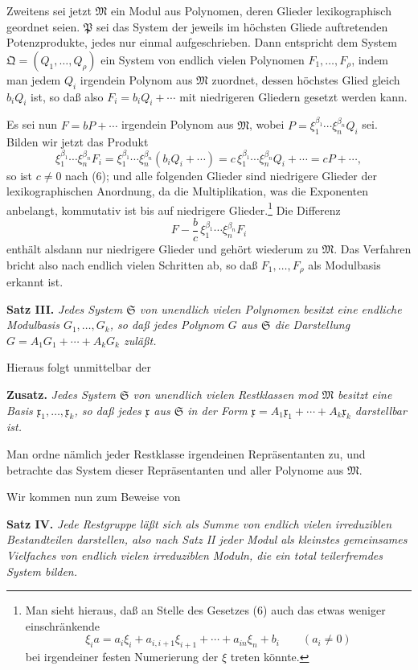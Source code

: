 \documentclass[11pt]{article}
\newcommand{\mM}{\mathfrak{M}}
\newcommand{\mx}{\mathfrak{x}}
\newcommand{\mP}{\mathfrak{P}}
\newcommand{\mQ}{\mathfrak{Q}}
\newcommand{\mS}{\mathfrak{S}}
\begin{document}
Zweitens sei jetzt $\mM$ ein Modul aus Polynomen, deren Glieder lexikographisch geordnet seien. $\mP$ sei das System der jeweils im höchsten Gliede auftretenden Potenzprodukte, jedes nur einmal aufgeschrieben. Dann entspricht dem System $\mQ=(Q_1,\ldots,Q_\rho)$ ein System von endlich vielen Polynomen $F_1,\ldots,F_\rho$, indem man jedem $Q_i$ irgendein Polynom aus $\mM$ zuordnet, dessen höchstes Glied gleich $b_iQ_i$ ist, so daß also $F_i=b_iQ_i+\cdots$ mit niedrigeren Gliedern gesetzt werden kann.

Es sei nun $F=bP+\cdots$ irgendein Polynom aus $\mM$, wobei $P=\xi_1^{\beta_1}\cdots\xi_n^{\beta_n}Q_i$ sei. Bilden wir jetzt das Produkt
\[
 \xi_1^{\beta_1}\cdots\xi_n^{\beta_n}F_i
 =\xi_1^{\beta_1}\cdots\xi_n^{\beta_n}(b_iQ_i+\cdots)
 =c\,\xi_1^{\beta_1}\cdots\xi_n^{\beta_n}Q_i+\cdots
 =cP+\cdots,
\]
so ist $c\ne0$ nach (6); und alle folgenden Glieder sind niedrigere Glieder der lexikographischen Anordnung, da die Multiplikation, was die Exponenten anbelangt, kommutativ ist bis auf niedrigere Glieder.\footnote{Man sieht hieraus, daß an Stelle des Gesetzes (6) auch das etwas weniger einschränkende
\[
 \xi_i a=a_i\xi_i+a_{i,i+1}\xi_{i+1}+\cdots+a_{in}\xi_n+b_i\qquad(a_i\ne0)
\]
bei irgendeiner festen Numerierung der $\xi$ treten könnte.} Die Differenz
\[
 F-\frac bc\,\xi_1^{\beta_1}\cdots\xi_n^{\beta_n}F_i
\]
enthält alsdann nur niedrigere Glieder und gehört wiederum zu $\mM$. Das Verfahren bricht also nach endlich vielen Schritten ab, so daß $F_1,\ldots,F_\rho$ als Modulbasis erkannt ist.

\textbf{Satz III.} \emph{Jedes System $\mS$ von unendlich vielen Polynomen besitzt eine endliche Modulbasis $G_1,\ldots,G_k$, so daß jedes Polynom $G$ aus $\mS$ die Darstellung $G=A_1G_1+\cdots+A_kG_k$ zuläßt.}

Hieraus folgt unmittelbar der

\textbf{Zusatz.} \emph{Jedes System $\mS$ von unendlich vielen Restklassen mod $\mM$ besitzt eine Basis $\mx_1,\ldots,\mx_k$, so daß jedes $\mx$ aus $\mS$ in der Form $\mx=A_1\mx_1+
\cdots+A_k\mx_k$ darstellbar ist.}

Man ordne nämlich jeder Restklasse irgendeinen Repräsentanten zu, und betrachte das System dieser Repräsentanten und aller Polynome aus $\mM$.

Wir kommen nun zum Beweise von

\textbf{Satz IV.} \emph{Jede Restgruppe läßt sich als Summe von endlich vielen irreduziblen Bestandteilen darstellen, also nach Satz II jeder Modul als kleinstes gemeinsames Vielfaches von endlich vielen irreduziblen Moduln, die ein total teilerfremdes System bilden.}
\end{document}
